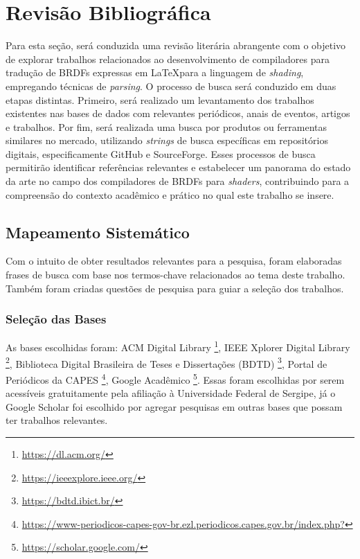 \documentclass[english, 
               brazil, 
               bsc] %
               {dcomp-abntex2}
\begin{document}
\chapter{Revisão Bibliográfica} \label{revisao}

Para esta seção, será conduzida uma revisão literária abrangente com o objetivo de explorar trabalhos relacionados ao desenvolvimento de compiladores para tradução de BRDFs expressas em \LaTeX  para a linguagem de \textit{shading}, empregando técnicas de \textit{parsing}. O processo de busca será conduzido em duas etapas distintas. Primeiro, será realizado um levantamento dos trabalhos existentes nas bases de dados  com relevantes periódicos, anais de eventos, artigos e trabalhos. Por fim, será realizada uma busca por produtos ou ferramentas similares no mercado, utilizando \textit{strings} de busca específicas em repositórios digitais, especificamente GitHub e SourceForge. Esses processos de busca permitirão identificar referências relevantes e estabelecer um panorama do estado da arte no campo dos compiladores de BRDFs  para \textit{shaders}, contribuindo para a compreensão do contexto acadêmico e prático no qual este trabalho se insere.

\section{Mapeamento Sistemático}

Com o intuito de obter resultados relevantes para a pesquisa, foram elaboradas frases de busca com base nos termos-chave relacionados ao tema deste trabalho. Também foram criadas questões de pesquisa para guiar a seleção dos trabalhos.

\subsection{Seleção das Bases}
As bases escolhidas foram: ACM Digital Library \footnote{\url{https://dl.acm.org/}},  IEEE Xplorer Digital Library \footnote{\url{https://ieeexplore.ieee.org/}},  Biblioteca Digital Brasileira de Teses e Dissertações (BDTD) \footnote{\url{https://bdtd.ibict.br/}}, Portal de Periódicos da CAPES \footnote{\url{https://www-periodicos-capes-gov-br.ezl.periodicos.capes.gov.br/index.php?}},  Google Acadêmico \footnote{\url{https://scholar.google.com/}}. Essas foram escolhidas por serem acessíveis gratuitamente pela afiliação à Universidade Federal de Sergipe, já o Google Scholar foi escolhido por agregar pesquisas em outras bases que possam ter trabalhos relevantes.
\end{document}
